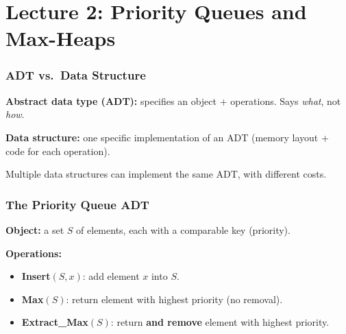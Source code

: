 \documentclass[11pt]{article}
\begin{document}
\newpage


\part*{\textcolor{utnavy}{Lecture 2: Priority Queues and Max-Heaps}}

\section{ADT vs.\ Data Structure}

\begin{defbox}
\textbf{Abstract data type (ADT):} specifies an \textcolor{rustW}{object} + \textcolor{rustW}{operations}. Says \emph{what}, not \emph{how}.

\textbf{Data structure:} \textcolor{rustW}{one specific implementation} of an ADT (memory layout + code for each operation).

Multiple data structures can implement the same ADT, with different costs.
\end{defbox}

\section{The Priority Queue ADT}

\begin{defbox}
\textbf{Object:} a set $S$ of elements, each with a comparable \textcolor{rustW}{key} (priority).

\textbf{Operations:}
\begin{itemize}[leftmargin=1.4em,itemsep=1pt]
  \item \textbf{Insert}$(S,x)$: add element $x$ into $S$.
  \item \textbf{Max}$(S)$: return element with highest priority (no removal).
  \item \textbf{Extract\_Max}$(S)$: return \textbf{and remove} element with highest priority.
\end{itemize}
\end{defbox}
\end{document}
